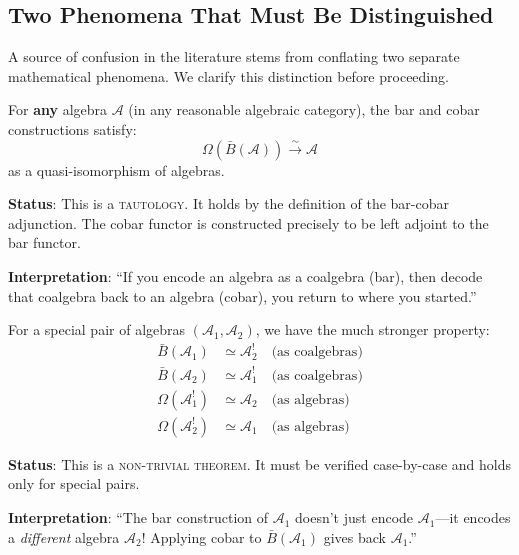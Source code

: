 \subsection{Two Phenomena That Must Be Distinguished}
\label{subsec:two-phenomena-distinguished}

A source of confusion in the literature stems from conflating two separate mathematical 
phenomena. We clarify this distinction before proceeding.

\begin{definition}
\label{def:bar-cobar-inversion}
For \textbf{any} algebra $\mathcal{A}$ (in any reasonable algebraic category), the 
bar and cobar constructions satisfy:
$$\Omega(\bar{B}(\mathcal{A})) \xrightarrow{\sim} \mathcal{A}$$
as a quasi-isomorphism of algebras.

\textbf{Status}: This is a \textsc{tautology}. It holds by the definition of the 
bar-cobar adjunction. The cobar functor is constructed precisely to be left adjoint 
to the bar functor.

\textbf{Interpretation}: ``If you encode an algebra as a coalgebra (bar), then decode 
that coalgebra back to an algebra (cobar), you return to where you started.''
\end{definition}

\begin{definition}
\label{def:koszul-duality-phenomenon}
For a special pair of algebras $(\mathcal{A}_1, \mathcal{A}_2)$, we have the much 
stronger property:
\begin{align}
\bar{B}(\mathcal{A}_1) &\simeq \mathcal{A}_2^! \quad \text{(as coalgebras)} \\
\bar{B}(\mathcal{A}_2) &\simeq \mathcal{A}_1^! \quad \text{(as coalgebras)} \\
\Omega(\mathcal{A}_1^!) &\simeq \mathcal{A}_2 \quad \text{(as algebras)} \\
\Omega(\mathcal{A}_2^!) &\simeq \mathcal{A}_1 \quad \text{(as algebras)}
\end{align}

\textbf{Status}: This is a \textsc{non-trivial theorem}. It must be verified case-by-case 
and holds only for special pairs.

\textbf{Interpretation}: ``The bar construction of $\mathcal{A}_1$ doesn't just encode 
$\mathcal{A}_1$—it encodes a \emph{different} algebra $\mathcal{A}_2$! Applying cobar 
to $\bar{B}(\mathcal{A}_1)$ gives back $\mathcal{A}_1$.''
\end{definition}

